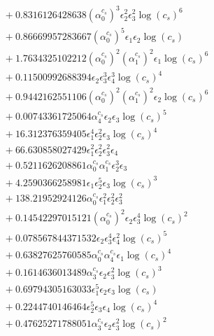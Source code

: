\documentclass[10pt]{article}
\begin{document}
\begin{align*}
&{}  + 0.8316126428638 \left(\alpha_{0}^{c_s}\right)^{3} \epsilon_{2}^{2} \epsilon_{3}^{2} \log{\left(c_{s} \right)}^{6} \\
&{}  + 0.86669957283667 \left(\alpha_{0}^{c_s}\right)^{5} \epsilon_{1} \epsilon_{2} \log{\left(c_{s} \right)} \\
&{}  + 1.7634325102212 \left(\alpha_{0}^{c_s}\right)^{2} \left(\alpha_{1}^{c_s}\right)^{2} \epsilon_{1} \log{\left(c_{s} \right)}^{6} \\
&{}  + 0.11500992688394 \epsilon_{2} \epsilon_{3}^{3} \epsilon_{4}^{3} \log{\left(c_{s} \right)}^{4} \\
&{}  + 0.9442162551106 \left(\alpha_{0}^{c_s}\right)^{2} \left(\alpha_{1}^{c_s}\right)^{2} \epsilon_{2} \log{\left(c_{s} \right)}^{6} \\
&{}  + 0.00743361725064 \alpha_{4}^{c_s} \epsilon_{2} \epsilon_{3} \log{\left(c_{s} \right)}^{5} \\
&{}  + 16.312376359405 \epsilon_{1}^{4} \epsilon_{2}^{2} \epsilon_{3} \log{\left(c_{s} \right)}^{4} \\
&{}  + 66.630858027429 \epsilon_{1}^{2} \epsilon_{2}^{2} \epsilon_{3}^{2} \epsilon_{4} \\
&{}  + 0.5211626208861 \alpha_{0}^{c_s} \alpha_{1}^{c_s} \epsilon_{2}^{3} \epsilon_{3} \\
&{}  + 4.2590366258981 \epsilon_{1} \epsilon_{2}^{5} \epsilon_{3} \log{\left(c_{s} \right)}^{3} \\
&{}  + 138.21952924126 \alpha_{0}^{c_s} \epsilon_{1}^{2} \epsilon_{2}^{2} \epsilon_{3}^{2} \\
&{}  + 0.14542297015121 \left(\alpha_{0}^{c_s}\right)^{2} \epsilon_{2} \epsilon_{3}^{4} \log{\left(c_{s} \right)}^{2} \\
&{}  + 0.078567844371532 \epsilon_{2} \epsilon_{3}^{4} \epsilon_{4}^{2} \log{\left(c_{s} \right)}^{5} \\
&{}  + 0.63827625760585 \alpha_{0}^{c_s} \alpha_{4}^{c_s} \epsilon_{1} \log{\left(c_{s} \right)}^{4} \\
&{}  + 0.1614636013489 \alpha_{3}^{c_s} \epsilon_{2} \epsilon_{3}^{2} \log{\left(c_{s} \right)}^{3} \\
&{}  + 0.69794305163033 \epsilon_{1}^{5} \epsilon_{2} \epsilon_{3} \log{\left(c_{s} \right)} \\
&{}  + 0.2244740146464 \epsilon_{2}^{5} \epsilon_{3} \epsilon_{4} \log{\left(c_{s} \right)}^{4} \\
&{}  + 0.47625271788051 \alpha_{3}^{c_s} \epsilon_{2} \epsilon_{3}^{2} \log{\left(c_{s} \right)}^{2} \\

\end{align*}
\end{document}

